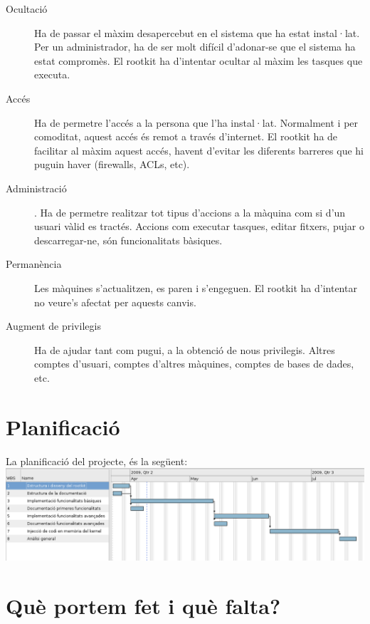\documentclass[a4paper]{article}
\begin{document}
\begin{description}
\item[Ocultació] Ha de passar el màxim desapercebut en el sistema que ha
estat instal·lat. Per un administrador, ha de ser molt difícil d'adonar-se que el
sistema ha estat compromès. El rootkit ha d'intentar ocultar al màxim les tasques
que executa.
\item[Accés] Ha de permetre l'accés a la persona que
l'ha instal·lat. Normalment i per comoditat, aquest accés és remot a través
d'internet. El rootkit ha de facilitar al màxim aquest accés, havent d'evitar les diferents 
barreres que hi puguin haver (firewalls, ACLs, etc).
\item[Administració]. Ha de permetre realitzar tot tipus
d'accions a la màquina com si d'un usuari vàlid es tractés. Accions com executar
tasques, editar fitxers, pujar o descarregar-ne, són funcionalitats bàsiques.
\item[Permanència] Les màquines s'actualitzen, es paren i s'engeguen. El rootkit ha
d'intentar no veure's afectat per aquests canvis.
\item[Augment de privilegis] Ha de ajudar tant com pugui, a la obtenció de nous
privilegis. Altres comptes d'usuari, comptes d'altres màquines, comptes de bases de dades, etc.
\end{description}


\section{Planificació}
La planificació del projecte, és la següent: \\
\newline
\includegraphics[width=\textwidth,keepaspectratio]{gantt.png}


\section{Què portem fet i què falta?}
\end{document}
